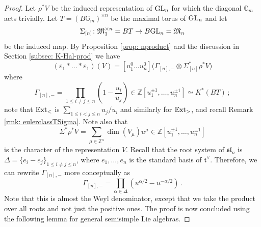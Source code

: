 \documentclass[12pt]{amsart}
\theoremstyle{definition}
\newcommand{\BG}{{\mathbb{G}}}
\newcommand{\BZ}{{\mathbb{Z}}}
\newcommand{\1}{\mathbf 1}
\newcommand{\FM}{{\mathfrak{M}}}
\newcommand{\Ft}{{\mathfrak{t}}}
\newcommand{\fsl}{{\mathfrak{sl}}}
\newcommand{\Ext}{\mathcal{E}\text{xt}}
\newcommand{\GL}{{\rm GL}}
\renewcommand{\Ext}{\textup{Ext}}
\begin{document}
\begin{proof}
Let $\rho^\ast V$ be the induced representation of $\GL_n$ for which the diagonal $\BG_m$ acts trivially. Let $T=(B\BG_m)^{\times n}$ be the maximal torus of $\GL_n$ and let 
\[\Sigma_{[n]}\colon \FM_1^{\times n}=BT\to B\GL_n=\FM_n\]
be the induced map. By Proposition \ref{prop: nproduct} and the discussion in Section \ref{subsec: K-Hal-prod} we have 
\[(\varepsilon_1\ast\ldots \ast\varepsilon_1)(V)=[u_1^0\ldots u_n^0]\big(\Gamma_{[n], -}\otimes \Sigma^\ast_{[n]}\rho^\ast V\big)\]
where 
\[\Gamma_{[n], -}=\prod_{1\leq i\neq j\leq n}\left(1-\frac{u_i}{u_j}\right)\in \BZ[u_1^{\pm 1}, \ldots, u_n^{\pm 1}]\simeq K^\ast(BT)\,;\]
note that $\Ext_{<}$ is $\sum_{1\leq i<j\leq n}u_j/u_i$ and similarly for $\Ext_{>}$, and recall Remark \ref{rmk: eulerclassTSigma}. Note also that 
\[\Sigma^\ast \rho^\ast V=\sum_{\mu\in \BZ^n} \dim(V_\mu)u^\mu \in \BZ[u_1^{\pm 1}, \ldots, u_n^{\pm 1}]\]
is the character of the representation $V$. Recall that the root system of $\fsl_n$ is $\Delta=\{e_i-e_j\}_{1\leq i\neq j\leq n}$, where $e_1, \ldots, e_n$ is the standard basis of $\Ft^\vee$. Therefore, we can rewrite $\Gamma_{[n], -}$ more conceptually as
\[\Gamma_{[n], -}=\prod_{\alpha\in \Delta}(u^{\alpha/2}-u^{-\alpha/2})\,.\]
Note that this is almost the Weyl denominator, except that we take the product over all roots and not just the positive ones. The proof is now concluded using the following lemma for general semisimple Lie algebras.
\end{proof}
\end{document}
